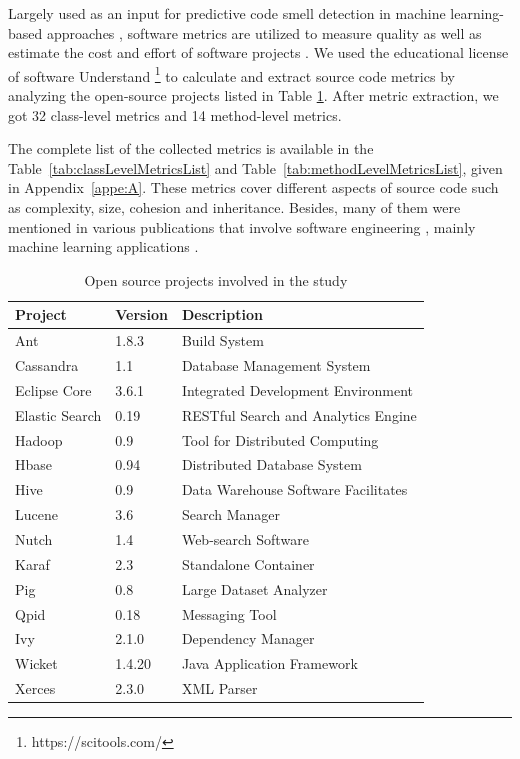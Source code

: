 Largely used as an input for predictive code smell detection in machine learning-based approaches \cite{fontana2016comparing, palomba2018detecting, hozano2017, fontana2013code, azeem2019machine}, software metrics are utilized to measure quality as well as estimate the cost and effort of software projects \cite{fenton2014software}. We used the educational license of software Understand \footnote{https://scitools.com/} to calculate and extract source code metrics by analyzing the open-source projects listed in Table \ref{tbl:openSourceProjects}. After metric extraction, we got 32 class-level metrics and 14 method-level metrics. 

The complete list of the collected metrics is available in the 
Table~\ref{tab:classLevelMetricsList} and Table~\ref{tab:methodLevelMetricsList}, given in Appendix~\ref{appe:A}. These metrics cover different aspects of source code such as complexity, size, cohesion and inheritance. Besides, many of them were mentioned in various publications that involve software engineering \cite{nunez2017source}, mainly machine learning applications \cite{azeem2019machine}.

\begin{table}[t]
\centering
\addtolength{\extrarowheight}{\belowrulesep}
\setlength{\aboverulesep}{0pt}
\setlength{\belowrulesep}{0pt}
\caption{Open source projects involved in the study}
\label{tbl:openSourceProjects}
\begin{tabular}{lll}
\toprule
\rowcolor[rgb]{0.753,0.753,0.753}  \textbf{Project} &   \textbf{Version}    & \textbf{Description}\\ 
\toprule
Ant & 1.8.3 & Build System  \\
Cassandra & 1.1 & Database Management System  \\
Eclipse Core & 3.6.1 & Integrated Development Environment  \\
Elastic Search & 0.19 & RESTful Search and Analytics Engine  \\
Hadoop & 0.9 & Tool for Distributed Computing  \\
Hbase & 0.94 & Distributed Database System  \\
Hive & 0.9 & Data Warehouse Software Facilitates  \\
Lucene & 3.6 & Search Manager  \\
Nutch & 1.4 & Web-search Software  \\
Karaf & 2.3 & Standalone Container  \\
Pig & 0.8 & Large Dataset Analyzer  \\
Qpid & 0.18 & Messaging Tool  \\
Ivy & 2.1.0 & Dependency Manager  \\
Wicket & 1.4.20 & Java Application Framework  \\
Xerces & 2.3.0 & XML Parser  \\
\bottomrule
\end{tabular}
\end{table}

